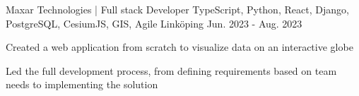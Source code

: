\begin{cventries}
  \cventry
    {Maxar Technologies | Full stack Developer} %
    {TypeScript, Python, React, Django, PostgreSQL, CesiumJS, GIS, Agile} %
    {Linköping} %
    {Jun. 2023 - Aug. 2023} %
    {
      \begin{cvitems} %
        \item {Created a web application from scratch to visualize data on an interactive globe}
        \item {Led the full development process, from defining requirements based on team needs to implementing the solution}
      \end{cvitems}
    }

\end{cventries}